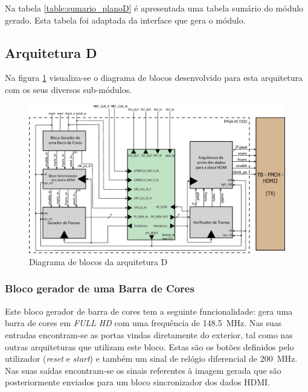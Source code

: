 \documentclass[11pt,a4paper]{article}
\begin{document}
	Na tabela \ref {table:sumario_planoD} é apresentada uma tabela sumário do módulo gerado. Esta tabela foi adaptada da interface que gera o módulo.

	\subsection{Arquitetura D} \label{sub_planD}
	Na figura \ref{fig:planoD} visualiza-se o diagrama de blocos desenvolvido para esta arquitetura com os seus diversos sub-módulos. 
	
		\begin{figure}[h!]
			\begin{center}
				\includegraphics[width=1.0\textwidth]{planod} 
				\caption{Diagrama de blocos da arquitetura D}
				\label{fig:planoD}
			\end{center}
		\end{figure}
	
	\subsubsection*{Bloco gerador de uma Barra de Cores} \label{subsub:serial_colorBarGenerator}
	
	Este bloco gerador de barra de cores tem a seguinte funcionalidade: gera uma barra de cores em \textit{FULL HD} com uma frequência de \SI{148.5}{\mega\hertz}. Nas suas entradas encontram-se as portas vindas diretamente do exterior, tal como nas outras arquiteturas que utilizam este bloco. Estas são os botões definidos pelo utilizador (\textit{reset} e \textit{start}) e também um sinal de relógio diferencial de \SI{200}{\mega\hertz}. Nas suas saídas encontram-se os sinais referentes à imagem gerada que são posteriormente enviados para um bloco sincronizador dos dados HDMI.
	
\end{document}
